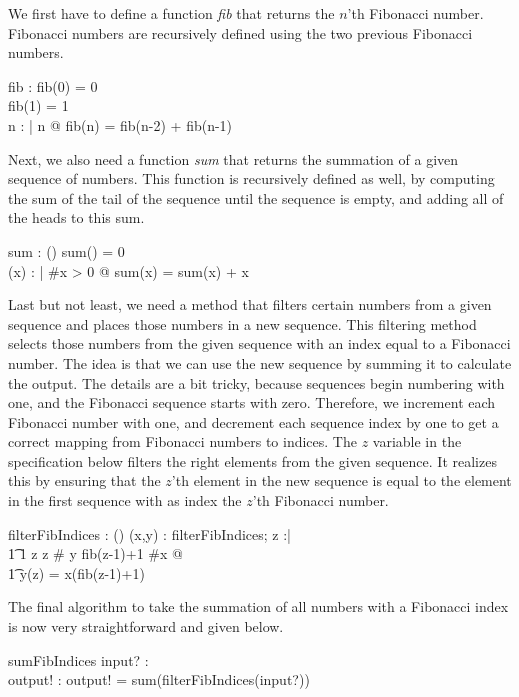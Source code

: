 \documentclass[12pt]{article}
\begin{document}
We first have to define a function  \textit{fib} that returns the $n$'th Fibonacci number. Fibonacci numbers are recursively defined using the two previous Fibonacci numbers.
\begin{axdef}
fib : \nat \fun \nat
\where
fib(0) = 0 \\
fib(1) = 1 \\
\forall n : \nat | n  @ fib(n) = fib(n-2) + fib(n-1)
\end{axdef}

Next, we also need a function \textit{sum} that returns the summation of a given sequence of numbers. This function is recursively defined as well, by computing the sum of the tail of the sequence until the sequence is empty, and adding all of the heads to this sum.
\begin{axdef}
sum : \power (\seq \real \fun \real)
\where
sum(\langle\rangle) = 0 \\
\forall (x) : \seq \real | \#x > 0 @ sum(x) = sum(\tail x) + \head x
\end{axdef}

Last but not least, we need a method that filters certain numbers from a given sequence and places those numbers in a new sequence. This filtering method selects those numbers from the given sequence with an index equal to a Fibonacci number. The idea is that we can use the new sequence by summing it to calculate the output. The details are a bit tricky, because sequences begin numbering with one, and the Fibonacci sequence starts with zero. Therefore, we increment each Fibonacci number with one, and decrement each sequence index by one to get a correct mapping from Fibonacci numbers to indices. The $z$ variable in the specification below filters the right elements from the given sequence. It realizes this by ensuring that the $z$'th element in the new sequence is equal to the element in the first sequence with as index the $z$'th Fibonacci number.
\begin{axdef}
filterFibIndices : \power (\seq \real \fun \seq \real)
\where
\forall (x,y) : filterFibIndices; z :\nat | \\
\t1 1 \leq z \wedge z \leq \# y \wedge fib(z-1)+1 \leq \#x @ \\
\t1 y(z) = x(fib(z-1)+1)
\end{axdef}

The final algorithm to take the summation of all numbers with a Fibonacci index is now very straightforward and given below.
\begin{schema}{sumFibIndices}
input? : \seq \real \\
output! : \real
\where
output! = sum(filterFibIndices(input?))
\end{schema}
\end{document}
